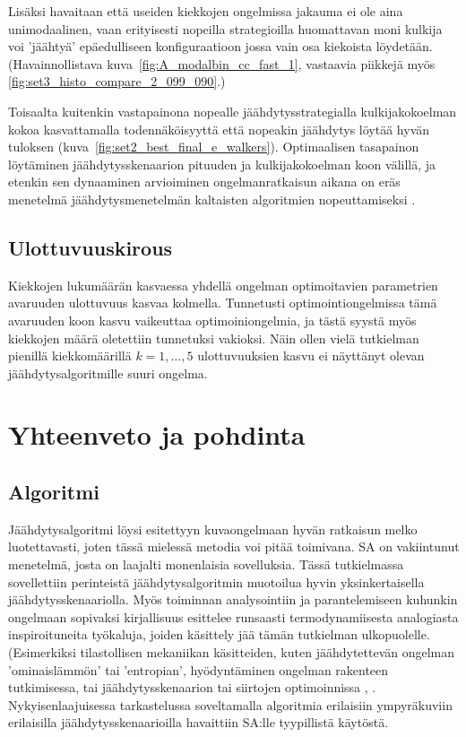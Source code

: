 Lisäksi havaitaan että useiden kiekkojen ongelmissa jakauma ei ole aina unimodaalinen,
vaan erityisesti nopeilla strategioilla huomattavan moni kulkija voi 'jäähtyä' epäedulliseen konfiguraatioon jossa vain osa kiekoista löydetään.
(Havainnollistava kuva~\ref{fig:A_modalbin_cc_fast_1}, vastaavia piikkejä myös \ref{fig:set3_histo_compare_2_099_090}.)

Toisaalta kuitenkin vastapainona nopealle jäähdytysstrategialla kulkijakokoelman kokoa kasvattamalla todennäköisyyttä että nopeakin jäähdytys löytää hyvän tuloksen (kuva~\ref{fig:set2_best_final_e_walkers}).
Optimaalisen tasapainon löytäminen jäähdytysskenaarion pituuden ja kulkijakokoelman koon välillä, ja etenkin sen dynaaminen arvioiminen ongelmanratkaisun aikana on eräs menetelmä jäähdytysmenetelmän kaltaisten algoritmien nopeuttamiseksi \cite{salamonetal}.

\subsection{Ulottuvuuskirous}
\label{sub:ulottuvuuskirous}

Kiekkojen lukumäärän kasvaessa yhdellä ongelman optimoitavien parametrien avaruuden ulottuvuus kasvaa kolmella.
Tunnetusti optimointiongelmissa tämä avaruuden koon kasvu vaikeuttaa optimoiniongelmia, ja tästä syystä myös kiekkojen määrä oletettiin tunnetuksi vakioksi.
Näin ollen vielä tutkielman pienillä kiekkomäärillä $k = 1, \dots, 5$ ulottuvuuksien kasvu ei näyttänyt olevan jäähdytysalgoritmille suuri ongelma.

\section{Yhteenveto ja pohdinta}
\label{sec:johtopaatokset}

\subsection{Algoritmi}
\label{sub:jp_algoritmi}

Jäähdytysalgoritmi löysi esitettyyn kuvaongelmaan hyvän ratkaisun melko luotettavasti,
joten tässä mielessä metodia voi pitää toimivana.
SA on vakiintunut menetelmä, josta on laajalti monenlaisia sovelluksia.
Tässä tutkielmassa sovellettiin perinteistä jäähdytysalgoritmin muotoilua hyvin yksinkertaisella jäähdytysskenaariolla.
Myös toiminnan analysointiin ja parantelemiseen kuhunkin ongelmaan sopivaksi kirjallisuus esittelee runsaasti termodynamiisesta analogiasta inspiroituneita työkaluja,
joiden käsittely jää tämän tutkielman ulkopuolelle.
(Esimerkiksi tilastollisen mekaniikan käsitteiden, kuten jäähdytettevän ongelman 'ominaislämmön' tai 'entropian', hyödyntäminen ongelman rakenteen tutkimisessa, tai jäähdytysskenaarion tai siirtojen optimoinnissa , \cite[ks.][]{salamonetal}.
Nykyisenlaajuisessa tarkastelussa soveltamalla algoritmia erilaisiin ympyräkuviin erilaisilla jäähdytysskenaarioilla havaittiin SA:lle tyypillistä käytöstä.

